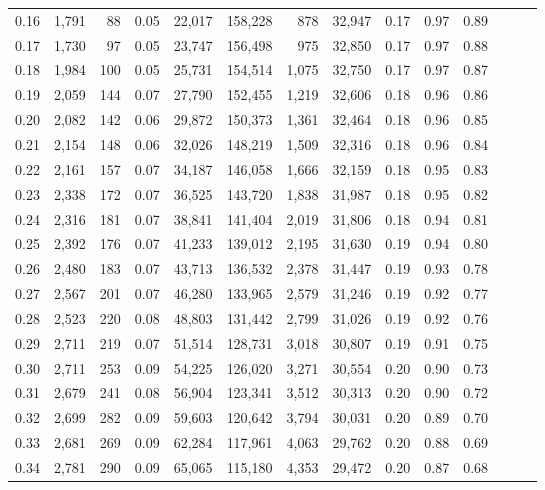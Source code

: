 \begin{tabular}{rrrrrrrrrrrrrr}
0.16 &  1,791 &   88 &  0.05 &   22,017 &  158,228 &     878 &  32,947 &  0.17 &  0.97 &      0.89 \\
0.17 &  1,730 &   97 &  0.05 &   23,747 &  156,498 &     975 &  32,850 &  0.17 &  0.97 &      0.88 \\
0.18 &  1,984 &  100 &  0.05 &   25,731 &  154,514 &   1,075 &  32,750 &  0.17 &  0.97 &      0.87 \\
0.19 &  2,059 &  144 &  0.07 &   27,790 &  152,455 &   1,219 &  32,606 &  0.18 &  0.96 &      0.86 \\
0.20 &  2,082 &  142 &  0.06 &   29,872 &  150,373 &   1,361 &  32,464 &  0.18 &  0.96 &      0.85 \\
0.21 &  2,154 &  148 &  0.06 &   32,026 &  148,219 &   1,509 &  32,316 &  0.18 &  0.96 &      0.84 \\
0.22 &  2,161 &  157 &  0.07 &   34,187 &  146,058 &   1,666 &  32,159 &  0.18 &  0.95 &      0.83 \\
0.23 &  2,338 &  172 &  0.07 &   36,525 &  143,720 &   1,838 &  31,987 &  0.18 &  0.95 &      0.82 \\
0.24 &  2,316 &  181 &  0.07 &   38,841 &  141,404 &   2,019 &  31,806 &  0.18 &  0.94 &      0.81 \\
0.25 &  2,392 &  176 &  0.07 &   41,233 &  139,012 &   2,195 &  31,630 &  0.19 &  0.94 &      0.80 \\
0.26 &  2,480 &  183 &  0.07 &   43,713 &  136,532 &   2,378 &  31,447 &  0.19 &  0.93 &      0.78 \\
0.27 &  2,567 &  201 &  0.07 &   46,280 &  133,965 &   2,579 &  31,246 &  0.19 &  0.92 &      0.77 \\
0.28 &  2,523 &  220 &  0.08 &   48,803 &  131,442 &   2,799 &  31,026 &  0.19 &  0.92 &      0.76 \\
0.29 &  2,711 &  219 &  0.07 &   51,514 &  128,731 &   3,018 &  30,807 &  0.19 &  0.91 &      0.75 \\
0.30 &  2,711 &  253 &  0.09 &   54,225 &  126,020 &   3,271 &  30,554 &  0.20 &  0.90 &      0.73 \\
0.31 &  2,679 &  241 &  0.08 &   56,904 &  123,341 &   3,512 &  30,313 &  0.20 &  0.90 &      0.72 \\
0.32 &  2,699 &  282 &  0.09 &   59,603 &  120,642 &   3,794 &  30,031 &  0.20 &  0.89 &      0.70 \\
0.33 &  2,681 &  269 &  0.09 &   62,284 &  117,961 &   4,063 &  29,762 &  0.20 &  0.88 &      0.69 \\
0.34 &  2,781 &  290 &  0.09 &   65,065 &  115,180 &   4,353 &  29,472 &  0.20 &  0.87 &      0.68 \\

\end{tabular}
